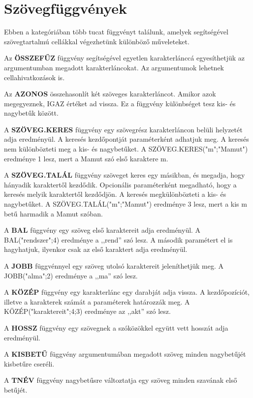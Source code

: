 \chapter{Szövegfüggvények}
\thispagestyle{empty}

Ebben a kategóriában több tucat függvényt találunk, amelyek
segítségével szövegtartalmú cellákkal végezhetünk
különböző műveleteket.

Az \textbf{ÖSSZEFŰZ} függvény segítségével egyetlen
karakterlánccá egyesíthetjük az  argumentumban megadott
karakterláncokat. Az argumentumok lehetnek cellahivatkozások is.

Az \textbf{AZONOS} összehasonlít két szöveges karakterláncot.
Amikor azok megegyeznek, IGAZ értéket ad vissza. Ez a függvény
különbséget tesz kis- és nagybetűk között.

A \textbf{SZÖVEG.KERES} függvény egy szövegrész karakterláncon
belüli helyzetét adja eredményül. A keresés
kezdőpontját paraméterként adhatjuk meg.  A keresés nem
különbözteti meg a kis- és nagybetűket. A
SZÖVEG.KERES("m";"Mamut")
eredménye 1 lesz, mert a Mamut szó első karaktere  m.

A \textbf{SZÖVEG.TALÁL} függvény szöveget keres egy másikban, és
megadja, hogy hányadik karaktertől kezdődik. Opcionális
paraméterként megadható, hogy a keresés melyik karaktertől
kezdődjön. A keresés megkülönbözteti a kis- és
nagybetűket. A
SZÖVEG.TALÁL("m";"Mamut")
eredménye 3 lesz, mert a kis m betű harmadik a Mamut szóban.

A \textbf{BAL} függvény egy szöveg első karaktereit adja
eredményül. A BAL("rendszer";4) eredménye a ,,rend'' szó lesz. A második
paramétert el is hagyhatjuk, ilyenkor csak az első karaktert adja
eredményül.

A \textbf{JOBB} függvénnyel egy szöveg utolsó karaktereit
jeleníthetjük meg. A JOBB("alma";2) eredménye a ,,ma'' szó lesz.

A \textbf{KÖZÉP} függvény egy karakterlánc egy darabját adja
vissza. A kezdőpozíciót, illetve a karakterek számát a
paraméterek határozzák meg. A KÖZÉP("karaktereit";4;3)
eredménye az ,,akt'' szó lesz.

A \textbf{HOSSZ} függvény egy szövegnek a szóközökkel együtt
vett hosszát adja eredményül.

A \textbf{KISBETŰ} függvény argumentumában megadott szöveg minden
nagybetűjét kisbetűre cseréli.

A \textbf{TNÉV} függvény nagybetűsre változtatja egy
szöveg minden szavának első betűjét.

